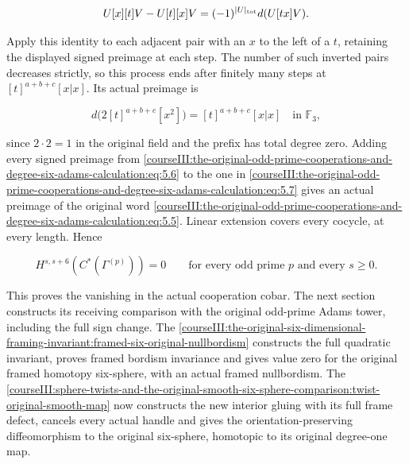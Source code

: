 \begin{equation}
U[x][t]V-U[t][x]V=(-1)^{|U|_{\rm tot}}d(U[tx]V).
 \label{courseIII:the-original-odd-prime-cooperations-and-degree-six-adams-calculation:eq:5.6}
\end{equation}

Apply this identity to each adjacent pair with an \(x\) to the left of a \(t\), retaining the displayed signed preimage at each step. The number of such inverted pairs decreases strictly, so this process ends after finitely many steps at \([t]^{a+b+c}[x|x]\). Its actual preimage is

\begin{equation}
d\bigl(2[t]^{a+b+c}[x^2]\bigr)=[t]^{a+b+c}[x|x]
 \quad\text{in }\mathbb F_3,
 \label{courseIII:the-original-odd-prime-cooperations-and-degree-six-adams-calculation:eq:5.7}
\end{equation}

since \(2\cdot2=1\) in the original field and the prefix has total degree zero. Adding every signed preimage from \eqref{courseIII:the-original-odd-prime-cooperations-and-degree-six-adams-calculation:eq:5.6} to the one in \eqref{courseIII:the-original-odd-prime-cooperations-and-degree-six-adams-calculation:eq:5.7} gives an actual preimage of the original word \eqref{courseIII:the-original-odd-prime-cooperations-and-degree-six-adams-calculation:eq:5.5}. Linear extension covers every cocycle, at every length. Hence

\begin{equation}
H^{s,s+6}(C^*(\Gamma^{(p)}))=0
 \qquad\text{for every odd prime }p\text{ and every }s\geq0.
 \label{courseIII:the-original-odd-prime-cooperations-and-degree-six-adams-calculation:eq:5.8}
\end{equation}

This proves the vanishing in the actual cooperation cobar. The next section constructs its receiving comparison with the original odd-prime Adams tower, including the full sign change. The \cref{courseIII:the-original-six-dimensional-framing-invariant:framed-six-original-nullbordism} constructs the full quadratic invariant, proves framed bordism invariance and gives value zero for the original framed homotopy six-sphere, with an actual framed nullbordism. The \cref{courseIII:sphere-twists-and-the-original-smooth-six-sphere-comparison:twist-original-smooth-map} now constructs the new interior gluing with its full frame defect, cancels every actual handle and gives the orientation-preserving diffeomorphism to the original six-sphere, homotopic to its original degree-one map.

